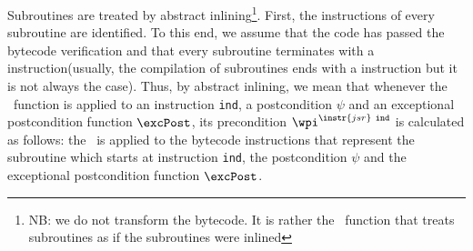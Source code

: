 Subroutines are treated by abstract inlining\footnote{NB: we do not transform the bytecode. It is rather the \wpi \
 function that treats subroutines as if the subroutines were inlined}. First, the instructions of every subroutine
 are identified. %
To this end, we assume that the code has passed the bytecode verification and that every subroutine terminates with a  
instruction(usually, the compilation of subroutines ends with a \instr{ret} instruction but it is not always the case). Thus, by abstract inlining, we mean that
 whenever the \wpi~function is applied to an instruction \instr{jsr}  \texttt{ind}, a postcondition $\psi$ and an exceptional postcondition function $\excPost$, its precondition  $\wpi^{\instr{jsr} \ \tt{ind}}$ is calculated as follows: the \wpi \ is applied to the bytecode instructions that represent the subroutine which starts at instruction \texttt{ind},
 the postcondition $\psi$ and the exceptional postcondition function  $\excPost$.
  








